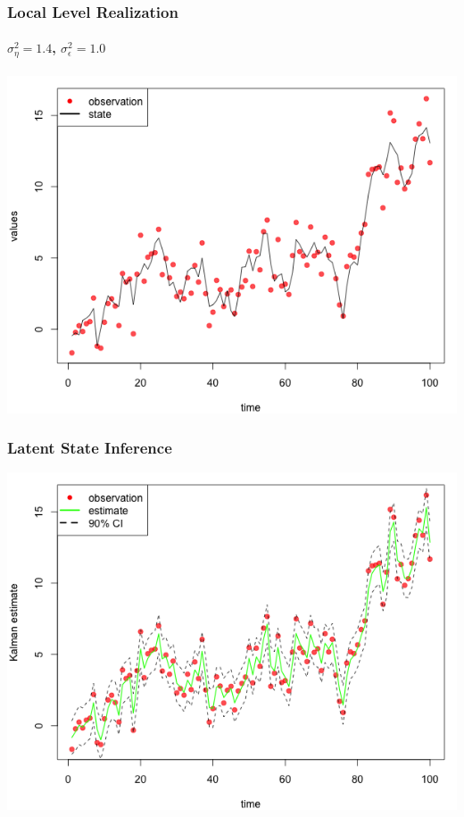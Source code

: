 \documentclass[11pt]{beamer}
\begin{document}
\begin{frame}
\frametitle{Local Level Realization}
\framesubtitle{$\sigma_{\eta}^2=1.4$, $\sigma_{\epsilon}^2=1.0$}

\centering
\includegraphics[scale=0.45]{ullm-realization}
\end{frame}

\begin{frame}
\frametitle{Latent State Inference}
\centering
\includegraphics[scale=0.45]{ullm-estimate-kalman}
\end{frame}
\end{document}
